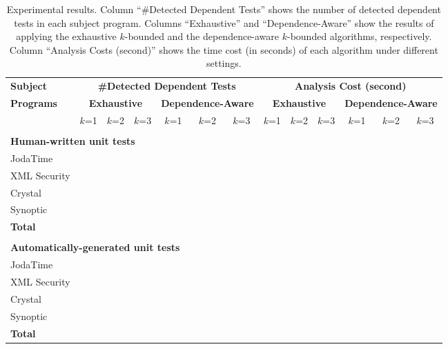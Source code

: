
\begin{table*}
\centering
\setlength{\tabcolsep}{0.3\tabcolsep}
\begin{tabular}{|l||c|c|c|c|c|c||c|c|c|c|c|c|}
\hline
\textbf{Subject} & \multicolumn{6}{|c||}{\textbf{\#Detected Dependent Tests}} & \multicolumn{6}{|c|}{\textbf{Analysis Cost (second)}}\\
\cline{2-13}
\textbf{Programs} & \multicolumn{3}{|c|}{\textbf{Exhaustive }} & \multicolumn{3}{|c||}{\textbf{Dependence-Aware}} & \multicolumn{3}{|c|}{\textbf{Exhaustive }} & \multicolumn{3}{|c|}{\textbf{Dependence-Aware}} \\
\cline{2-13}
& $k$=1 & $k$=2 & $k$=3 & $k$=1 & $k$=2 & $k$=3 &  $k$=1 & $k$=2 & $k$=3 & $k$=1 & $k$=2 & $k$=3 \\
\hline
\multicolumn{13}{|l|}{ }\\
\multicolumn{13}{|l|}{\textbf{Human-written unit tests} }\\
\hline
JodaTime & & & & & & & & & & & & \\
XML Security& & & & & & & & & & & & \\
Crystal & & & & & & & & & & & & \\
Synoptic & & & & & & & & & & & & \\
\hline
\textbf{Total} & & & & & & & & & & & & \\
\hline
\multicolumn{13}{|l|}{ }\\
\multicolumn{13}{|l|}{\textbf{Automatically-generated unit tests} }\\
\hline
JodaTime & & & & & & & & & & & & \\
XML Security& & & & & & & & & & & & \\
Crystal & & & & & & & & & & & & \\
Synoptic & & & & & & & & & & & & \\
\hline
\textbf{Total} & & & & & & & & & & & & \\
\hline
\end{tabular}
\caption{Experimental results. Column ``\#Detected Dependent Tests''
shows the number of detected dependent tests in each subject program.
Columns ``Exhaustive'' and ``Dependence-Aware'' show the results
of applying the exhaustive $k$-bounded and the dependence-aware
$k$-bounded algorithms, respectively. Column ``Analysis Costs (second)''
shows the time cost (in seconds) of each algorithm under
different settings.
}
\label{tab:results}
\end{table*}
